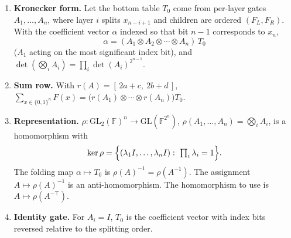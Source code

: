 \documentclass[11pt]{article}
\theoremstyle{definition}
\newcommand{\F}{\mathbb{F}}
\newcommand{\GL}{\mathrm{GL}}
\begin{document}
\begin{enumerate}[leftmargin=*]
\item \textbf{Kronecker form.} Let the bottom table $T_0$ come from per-layer gates $A_1,\dots,A_n$,
where layer $i$ splits $x_{n-i+1}$ and children are ordered $(F_L,F_R)$. With the coefficient
vector $\alpha$ indexed so that bit $n-1$ corresponds to $x_n$,
\[
\alpha=(A_1\otimes A_2\otimes\cdots\otimes A_n)\,T_0
\]
($A_1$ acting on the most significant index bit), and
$\det(\bigotimes_iA_i)=\prod_i\det(A_i)^{2^{n-1}}$.
\item \textbf{Sum row.} With $r(A)=[\,2a+c,\ 2b+d\,]$,
$\sum_{x\in\{0,1\}^n}F(x)=\bigl(r(A_1)\otimes\cdots\otimes r(A_n)\bigr)T_0$.
\item \textbf{Representation.} $\rho:\GL_2(\F)^n\to\GL(\F^{2^n})$,
$\rho(A_1,\dots,A_n)=\bigotimes_iA_i$, is a homomorphism with
\[
\ker\rho=\Bigl\{(\lambda_1I,\dots,\lambda_nI):\ \textstyle\prod_i\lambda_i=1\Bigr\}.
\]
The folding map $\alpha\mapsto T_0$ is $\rho(A)^{-1}=\rho(A^{-1})$. The assignment
$A\mapsto\rho(A)^{-1}$ is an anti-homomorphism. The homomorphism to use is
$A\mapsto\rho(A^{-\top})$.
\item \textbf{Identity gate.} For $A_i=I$, $T_0$ is the coefficient vector with index bits
reversed relative to the splitting order.
\end{enumerate}
\end{document}
